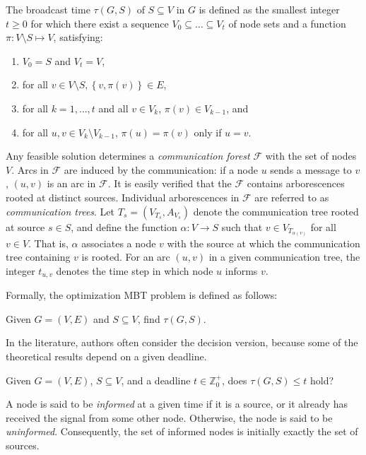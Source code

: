 \begin{definition}\label{def:mbt}
The broadcast time $\tau(G,S)$ of $S\subseteq V$ in $G$ is defined as the smallest integer $t\geq 0$
for which there exist a sequence $V_0\subseteq\dots\subseteq V_t$ of node sets and a function $\pi:V\setminus S\mapsto V$, satisfying:
\begin{enumerate}
\item $V_0=S$ and $V_t=V$,
\item for all $v\in V\setminus S, \left\{v,\pi(v)\right\}\in E$,
\item for all $k=1,\dots,t$ and all $v\in V_k$, $\pi(v)\in V_{k-1}$, and
\item for all $u,v\in V_k\setminus V_{k-1}$, $\pi(u)=\pi(v)$ only if $u=v$.
\end{enumerate}
\end{definition}
Any feasible solution determines a \emph{communication forest} $\mathcal{F}$ with the set of nodes $V$.
Arcs in $\mathcal{F}$ are induced by the communication: if a node $u$ sends a message to $v$, $(u,v)$ is an arc in $\mathcal{F}$.
It is easily verified that the $\mathcal{F}$ contains arborescences rooted at distinct sources.
Individual arborescences in $\mathcal{F}$ are referred to as \emph{communication trees}.
Let $T_s=\left(V_{T_s},A_{V_s}\right)$ denote the communication tree rooted at source $s\in S$, and define the function $\alpha:V\to S$ such that $v\in V_{T_{\alpha(v)}}$ for all $v\in V$.
That is, $\alpha$ associates a node $v$ with the source at which the communication tree containing $v$ is rooted.
For an arc $(u,v)$ in a given communication tree, the integer $t_{u,v}$ denotes the time step in which node $u$ informs $v$.

Formally, the optimization MBT problem is defined as follows:
\begin{problem}\label{mbt:opt}
Given $G=(V,E)$ and $S\subseteq V$, find $\tau(G,S)$. 
\end{problem}
In the literature, authors often consider the decision version, because some of the theoretical results depend on a given deadline.
\begin{problem}\label{mbt:dec}
Given $G=(V,E)$, $S\subseteq V$,  and a deadline $t\in \mathbb{Z}^+_0$, does $\tau(G,S)\leq t$ hold? 
\end{problem}
A node is said to be \emph{informed} at a given time if it is a source, or it already has received the signal from some other node. Otherwise, the node is said to be \emph{uninformed}.
Consequently, the set of informed nodes is initially exactly the set of sources.

